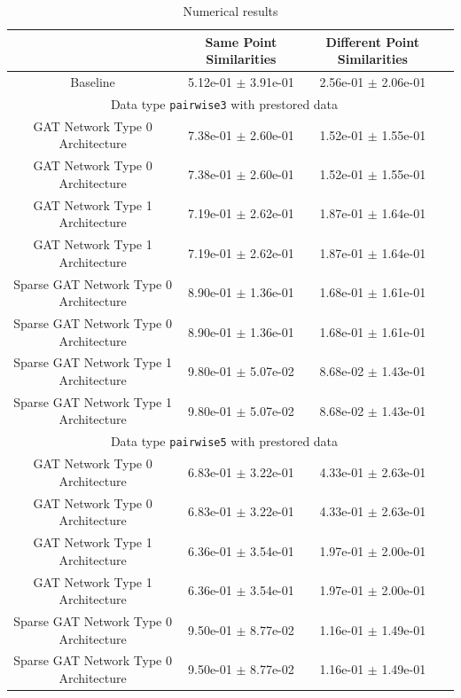\documentclass[a4paper]{article}
\begin{document}
\begin{table}[H]
  \caption{Numerical results}
      \begin{tabular}{|c|c|c|c|} \hline
                                      &  Same Point Similarities  &  Different Point Similarities  \\ \hline
Baseline   & 5.12e-01 $\pm$ 3.91e-01 & 2.56e-01 $\pm$ 2.06e-01 \\ \hline
\multicolumn{3}{|c|}{Data type \texttt{pairwise3} with prestored data} \\ \hline
GAT Network Type 0 Architecture   & 7.38e-01 $\pm$ 2.60e-01 & 1.52e-01 $\pm$ 1.55e-01 \\ \hline
GAT Network Type 0 Architecture   & 7.38e-01 $\pm$ 2.60e-01 & 1.52e-01 $\pm$ 1.55e-01 \\ \hline
GAT Network Type 1 Architecture   & 7.19e-01 $\pm$ 2.62e-01 & 1.87e-01 $\pm$ 1.64e-01 \\ \hline
GAT Network Type 1 Architecture   & 7.19e-01 $\pm$ 2.62e-01 & 1.87e-01 $\pm$ 1.64e-01 \\ \hline
Sparse GAT Network Type 0 Architecture   & 8.90e-01 $\pm$ 1.36e-01 & 1.68e-01 $\pm$ 1.61e-01 \\ \hline
Sparse GAT Network Type 0 Architecture   & 8.90e-01 $\pm$ 1.36e-01 & 1.68e-01 $\pm$ 1.61e-01 \\ \hline
Sparse GAT Network Type 1 Architecture   & 9.80e-01 $\pm$ 5.07e-02 & 8.68e-02 $\pm$ 1.43e-01 \\ \hline
Sparse GAT Network Type 1 Architecture   & 9.80e-01 $\pm$ 5.07e-02 & 8.68e-02 $\pm$ 1.43e-01 \\ \hline
\multicolumn{3}{|c|}{Data type \texttt{pairwise5} with prestored data} \\ \hline
GAT Network Type 0 Architecture   & 6.83e-01 $\pm$ 3.22e-01 & 4.33e-01 $\pm$ 2.63e-01 \\ \hline
GAT Network Type 0 Architecture   & 6.83e-01 $\pm$ 3.22e-01 & 4.33e-01 $\pm$ 2.63e-01 \\ \hline
GAT Network Type 1 Architecture   & 6.36e-01 $\pm$ 3.54e-01 & 1.97e-01 $\pm$ 2.00e-01 \\ \hline
GAT Network Type 1 Architecture   & 6.36e-01 $\pm$ 3.54e-01 & 1.97e-01 $\pm$ 2.00e-01 \\ \hline
Sparse GAT Network Type 0 Architecture   & 9.50e-01 $\pm$ 8.77e-02 & 1.16e-01 $\pm$ 1.49e-01 \\ \hline
Sparse GAT Network Type 0 Architecture   & 9.50e-01 $\pm$ 8.77e-02 & 1.16e-01 $\pm$ 1.49e-01 \\ \hline

\end{tabular}
\end{table}
\end{document}
